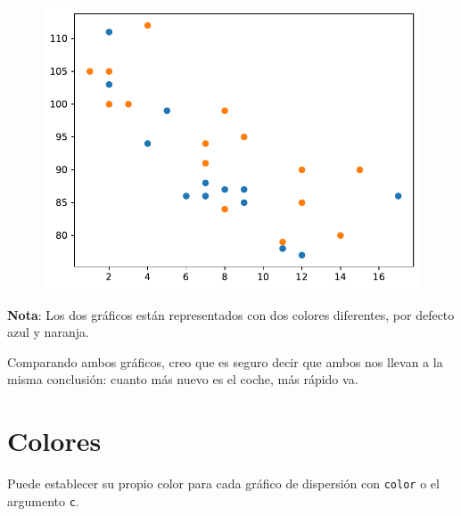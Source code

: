\begin{code}
\begin{figure}
  \centering
  \includegraphics[scale=0.6]{img/grafica1037.pdf}
\end{figure}
\end{code}

\textbf{Nota}: Los dos gráficos están representados con dos colores
diferentes, por defecto azul y naranja.

Comparando ambos gráficos, creo que es seguro decir que ambos nos llevan
a la misma conclusión: cuanto más nuevo es el coche, más rápido va.

\section{Colores}

Puede establecer su propio color para cada gráfico de dispersión con
\texttt{color} o el argumento \texttt{c}.

